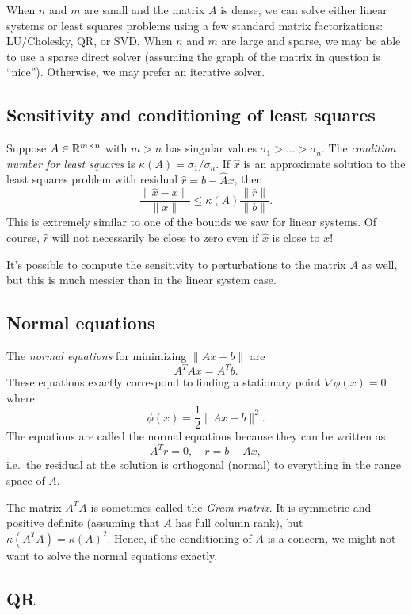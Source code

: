 \documentclass[12pt, leqno]{article}
\begin{document}
When $n$ and $m$ are small and the matrix $A$ is dense, we can solve
either linear systems or least squares problems using a few standard
matrix factorizations: LU/Cholesky, QR, or SVD.  When $n$ and $m$
are large and sparse, we may be able to use a sparse direct solver
(assuming the graph of the matrix in question is ``nice'').
Otherwise, we may prefer an iterative solver.

\subsection{Sensitivity and conditioning of least squares}

Suppose $A \in \mathbb{R}^{m \times n}$ with $m > n$ has singular values
$\sigma_1 > \ldots > \sigma_n$.
The {\em condition number for least squares}
is $\kappa(A) = \sigma_1/\sigma_n$.  If $\hat{x}$ is
an approximate solution to the least squares problem with residual
$\hat{r} = b-\hat{A} x$, then
\[
  \frac{\|\hat{x}-x\|}{\|x\|} \leq \kappa(A) \frac{\|\hat{r}\|}{\|b\|}.
\]
This is extremely similar to one of the bounds we saw for linear
systems.  Of course, $\hat{r}$ will not necessarily be close to zero
even if $\hat{x}$ is close to $x$!

It's possible to compute the sensitivity to perturbations to the
matrix $A$ as well, but this is much messier than in the linear system
case.

\subsection{Normal equations}

The {\em normal equations} for minimizing $\|Ax-b\|$ are
\[
  A^T A x = A^T b.
\]
These equations exactly correspond to finding a stationary point
$\nabla \phi(x) = 0$ where
\[
  \phi(x) = \frac{1}{2} \|Ax-b\|^2.
\]
The equations are called the normal equations because they
can be written as
\[
  A^T r = 0, \quad r = b-Ax,
\]
i.e.~the residual at the solution is orthogonal (normal) to everything
in the range space of $A$.
  
The matrix $A^T A$ is sometimes called the {\em Gram matrix}.  It is
symmetric and positive definite (assuming that $A$ has full column
rank), but $\kappa(A^T A) = \kappa(A)^2$.  Hence, if the conditioning
of $A$ is a concern, we might not want to solve the normal equations
exactly.

\subsection{QR}
\end{document}
